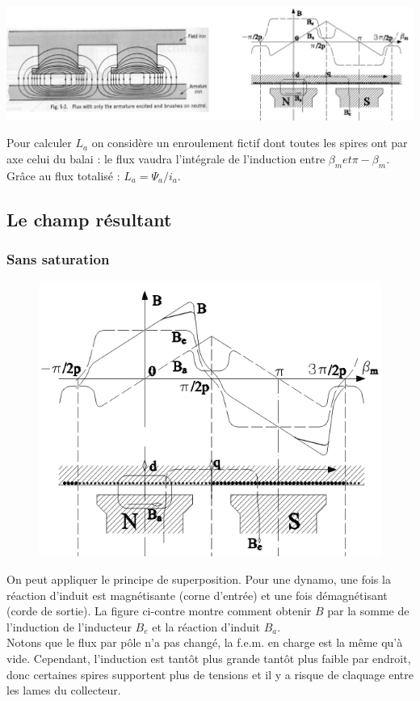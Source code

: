 		\begin{center}
		\includegraphics[scale=0.35]{ch4/image13.png}
		\end{center}
	
	Pour calculer $L_a$ on considère un enroulement fictif dont toutes 
	les spires ont par axe celui du balai : le flux vaudra l'intégrale 
	de l'induction entre $\beta_m et \pi-\beta_m$. Grâce au flux 
	totalisé : $L_a=\Psi_a/i_a$.
	
	\subsection{Le champ résultant}
		\subsubsection{Sans saturation}
		\begin{figure}
	\vspace{-25mm}
	\includegraphics[scale=0.34]{ch4/image14.png}
	\end{figure}
		On peut appliquer le principe de superposition. Pour une dynamo, 
		une fois la réaction d'induit est magnétisante (corne d'entrée) 
		et une fois démagnétisant (corde de sortie). La figure ci-contre 
		montre comment obtenir $B$ par la somme de l'induction de l'inducteur 
		$B_e$ et la réaction d'induit $B_a$.\\
		Notons que le flux par pôle n'a pas changé, la f.e.m. en charge est la 
		même qu'à vide. Cependant, l'induction est tantôt plus grande tantôt plus 
		faible par endroit, donc certaines spires supportent plus de tensions et il y a 
		risque de claquage entre les lames du collecteur. 
		
